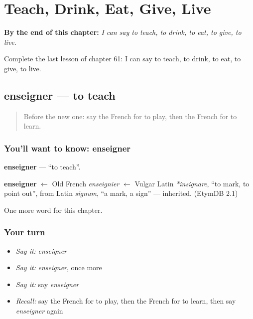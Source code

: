 
\chapter{Teach, Drink, Eat, Give, Live}
\label{ch:fr-teach-drink-eat-give-live}

\begin{chapteropening}
\textbf{By the end of this chapter:} \emph{I can say to teach, to drink, to eat, to give, to live.}

Complete the last lesson of chapter 61: I can say to teach, to drink, to eat, to give, to live.
\end{chapteropening}

\section[enseigner]{enseigner — to teach}

\label{lesson:FR-C61-enseigner}



\begin{quote}
Before the new one: say the French for to play, then the French for to learn.
\end{quote}

\subsection*{You'll want to know: enseigner}
\textbf{enseigner} — \textquotedblleft{}to teach\textquotedblright{}.

\begin{cousinweb}
\textbf{enseigner} $\leftarrow$ Old French \emph{enseignier} $\leftarrow$ Vulgar Latin \emph{*insignare}, \textquotedblleft{}to mark, to point out\textquotedblright{}, from Latin \emph{signum}, \textquotedblleft{}a mark, a sign\textquotedblright{} — inherited. (EtymDB 2.1)
\end{cousinweb}

\begin{grammarlens}[title={What you've built}]
One more word for this chapter.
\end{grammarlens}

\subsection*{Your turn}
\begin{itemize}
\raggedright
  \item \emph{Say it:} \emph{enseigner}
  \item \emph{Say it:} \emph{enseigner}, once more
  \item \emph{Say it:} say \emph{enseigner}
  \item \emph{Recall:} say the French for to play, then the French for to learn, then say \emph{enseigner} again
\end{itemize}

